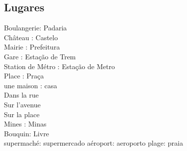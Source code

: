 \documentclass{article}
\begin{document}
    \subsection{Lugares}    
                                Boulangerie: Padaria\\
                                Château    : Castelo\\
                                Mairie     : Prefeitura\\
                                Gare       : Estação de Trem\\
                        Station de Métro   : Estação de Metro\\
                                Place      : Praça\\
                        une     maison     : casa\\
        Dans la rue\\
        Sur l'avenue\\
        Sur la place\\
        Mines  : Minas\\
        Bouquin: Livre\\
        supermaché: supermercado
        aéroport: aeroporto
        plage: praia
        
\end{document}
